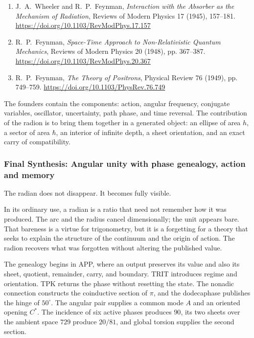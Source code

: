 \begin{enumerate}
\item\hypertarget{radionbib:WheelerFeynman1945}{}
J.~A.~Wheeler and R.~P.~Feynman,
\emph{Interaction with the Absorber as the Mechanism of Radiation},
Reviews of Modern Physics 17 (1945), 157--181.
\url{https://doi.org/10.1103/RevModPhys.17.157}

\item\hypertarget{radionbib:Feynman1948}{}
R.~P.~Feynman,
\emph{Space-Time Approach to Non-Relativistic Quantum Mechanics},
Reviews of Modern Physics 20 (1948), pp. 367--387.
\url{https://doi.org/10.1103/RevModPhys.20.367}

\item\hypertarget{radionbib:Feynman1949}{}
R.~P.~Feynman,
\emph{The Theory of Positrons},
Physical Review 76 (1949), pp. 749--759.
\url{https://doi.org/10.1103/PhysRev.76.749}
\end{enumerate}

\begin{narrativebox}
The founders contain the components: action, angular frequency, conjugate
variables, oscillator, uncertainty, path phase, and time reversal.
The contribution of the radion is to bring them together in a generated object: an ellipse of
area \(h\), a sector of area \(\hbar\), an interior of infinite depth,
a sheet orientation, and an exact carry of compatibility.
\end{narrativebox}
\subsubsection{Final Synthesis: Angular unity with phase genealogy, action and memory}

The radian does not disappear. It becomes fully visible.

In its ordinary use, a radian is a ratio that need not remember how it was
produced. The arc and the radius cancel dimensionally; the unit appears
bare. That bareness is a virtue for trigonometry, but it is a forgetting
for a theory that seeks to explain the structure of the continuum and the origin
of action. The radion recovers what was forgotten without altering the published value.

The genealogy begins in APP, where an output preserves its value and also its sheet, quotient, remainder, carry, and boundary. TRIT introduces regime and orientation. TPK returns the phase without resetting the state. The nonadic connection constructs the coinductive section of \(\pi\), and the dodecaphase publishes the hinge of \(50^\circ\). The angular pair supplies a common mode \(A\) and an oriented opening \(C^*\). The incidence of six active phases produces \(90\), its two sheets over the ambient space \(729\) produce \(20/81\), and global torsion supplies the second section.

